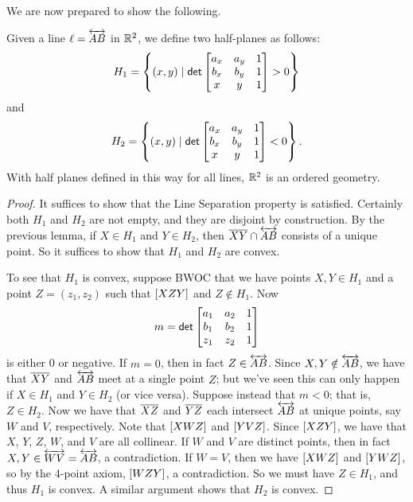 We are now prepared to show the following.

\begin{prop}\label{prop:rr2-line-sep}
Given a line \(\ell = \overleftrightarrow{AB}\) in \(\mathbb{R}^2\), we define two half-planes as follows: \[ H_1 = \left\{ (x, y) \mid \mathsf{det} \begin{bmatrix} a_x & a_y & 1 \\ b_x & b_y & 1 \\ x & y & 1 \end{bmatrix} > 0 \right\} \] and \[ H_2 = \left\{ (x, y) \mid \mathsf{det} \begin{bmatrix} a_x & a_y & 1 \\ b_x & b_y & 1 \\ x & y & 1 \end{bmatrix} < 0 \right\}. \]
With half planes defined in this way for all lines, \(\mathbb{R}^2\) is an ordered geometry.
\end{prop}

\begin{proof}
It suffices to show that the Line Separation property is satisfied.
Certainly both \(H_1\) and \(H_2\) are not empty, and they are disjoint by construction.
By the previous lemma, if \(X \in H_1\) and \(Y \in H_2\), then \(\overline{XY} \cap \overleftrightarrow{AB}\) consists of a unique point.
So it suffices to show that \(H_1\) and \(H_2\) are convex.

To see that \(H_1\) is convex, suppose BWOC that we have points \(X,Y \in H_1\) and a point \(Z = (z_1, z_2)\) such that \([ X Z Y ]\) and \(Z \notin H_1\).
Now \[ m = \mathsf{det} \begin{bmatrix} a_1 & a_2 & 1 \\ b_1 & b_2 & 1 \\ z_1 & z_2 & 1 \end{bmatrix} \] is either 0 or negative.
If \(m = 0\), then in fact \(Z \in \overleftrightarrow{AB}\).
Since \(X,Y \notin \overleftrightarrow{AB}\), we have that \(\overline{XY}\) and \(\overleftrightarrow{AB}\) meet at a single point \(Z\); but we've seen this can only happen if \(X \in H_1\) and \(Y \in H_2\) (or vice versa).
Suppose instead that \(m < 0\); that is, \(Z \in H_2\).
Now we have that \(\overline{XZ}\) and \(\overline{YZ}\) each intersect \(\overleftrightarrow{AB}\) at unique points, say \(W\) and \(V\), respectively.
Note that \([ X W Z ]\) and \([ Y V Z ]\).
Since \([ X Z Y ]\), we have that \(X\), \(Y\), \(Z\), \(W\), and \(V\) are all collinear.
If \(W\) and \(V\) are distinct points, then in fact \(X, Y \in \overleftrightarrow{WV} = \overleftrightarrow{AB}\), a contradiction.
If \(W = V\), then we have \([ X W Z ]\) and \([ Y W Z ]\), so by the 4-point axiom, \([ W Z Y ]\), a contradiction.
So we must have \(Z \in H_1\), and thus \(H_1\) is convex.
A similar argument shows that \(H_2\) is convex.
\end{proof}

